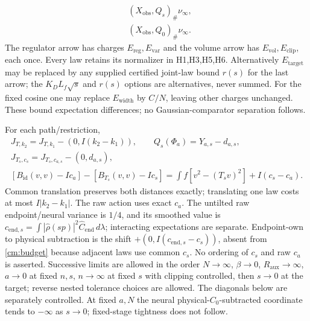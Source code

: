 \begin{theorem}
\begin{align*}
 &(X_{\mathrm{obs}},Q_s)_\#\nu_\infty,\\
 &(X_{\mathrm{obs}},Q_0)_\#\nu_\infty.
\end{align*}
The regulator arrow has charges $E_{\mathrm{reg}},E_{\mathrm{var}}$ and
the volume arrow has $E_{\mathrm{vol}},E_{\mathrm{clip}}$, each once.
Every law retains its normalizer in H1,H3,H5,H6. Alternatively
$E_{\mathrm{target}}$ may be replaced by any supplied certified joint-law
bound $r(s)$ for the last arrow; the $K_DL_f\sqrt s$ and $r(s)$ options
are alternatives, never summed. For the fixed cosine one may replace
$E_{\mathrm{width}}$ by $C/N$, leaving other charges unchanged.
These bound expectation differences; no Gaussian-comparator separation follows.
\end{theorem}

\begin{proposition}\label{cm:translations}
For each path/restriction,
\begin{gather*}
 J_{T,k_2}=J_{T,k_1}-(0,I(k_2-k_1)),\qquad
 Q_s(\Phi_a)=Y_{a,s}-d_{a,s},\\
 J_{T_s,c_s}=J_{T_s,c_{a,s}}-(0,d_{a,s}),\\
 [B_{\mathrm{id}}(v,v)-Ic_a]-[B_{T_s}(v,v)-Ic_s]
       =\int f[v^2-(T_sv)^2]+I(c_s-c_a).
\end{gather*}
Common translation preserves both distances exactly; translating one law
costs at most $I|k_2-k_1|$. The raw action uses exact $c_a$.
The untilted raw endpoint/neural variance is $1/4$, and its smoothed value is
$c_{\mathrm{end},s}=\int|\hat\rho(sp)|^2\hat C_{\mathrm{end}}\,d\lambda$;
interacting expectations are separate. Endpoint-own to physical subtraction
is the shift $+(0,I(c_{\mathrm{end},s}-c_s))$, absent from
\eqref{cm:budget} because adjacent laws use common $c_s$. No ordering of
$c_s$ and raw $c_a$ is asserted. Successive limits are allowed in the order
$N\to\infty$, $\beta\to0$, $R_{\mathrm{aux}}\to\infty$, $a\to0$ at fixed
$n,s$, $n\to\infty$ at fixed $s$ with clipping controlled, then
$s\to0$ at the target; reverse nested tolerance choices are allowed.
The diagonals below are separately controlled. At fixed $a,N$ the neural
physical-$C_0$-subtracted coordinate tends to $-\infty$ as $s\to0$;
fixed-stage tightness does not follow.
\end{proposition}

